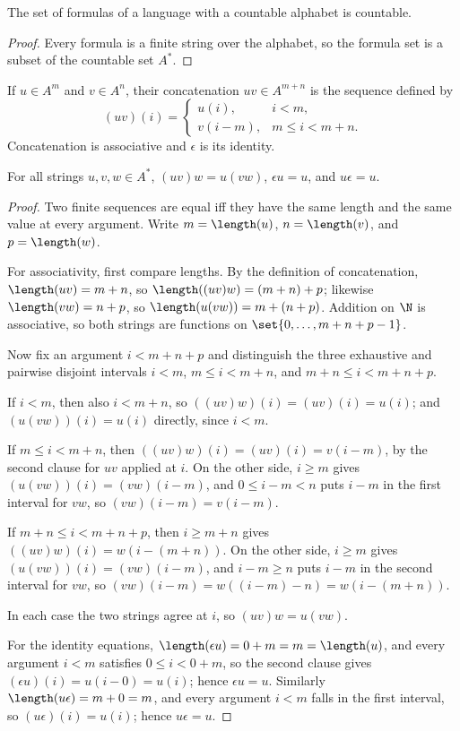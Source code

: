 \begin{corollary}
The set of formulas of a language with a countable alphabet is countable.
\end{corollary}
\begin{proof}
Every formula is a finite string over the alphabet, so the formula set is a
subset of the countable set \(A^*\).
\end{proof}

If \(u\in A^m\) and \(v\in A^n\), their concatenation \(uv\in A^{m+n}\) is
the sequence defined by
\[
  (uv)(i)=
  \begin{cases}
    u(i),&i<m,\\
    v(i-m),&m\leq i<m+n.
  \end{cases}
\]
Concatenation is associative and \(\epsilon\) is its identity.

\begin{lemma}
For all strings \(u,v,w\in A^*\),
\((uv)w=u(vw)\), \(\epsilon u=u\), and \(u\epsilon=u\).
\end{lemma}
\begin{proof}
Two finite sequences are equal iff they have the same length and the same
value at every argument.  Write \(m=\length(u)\), \(n=\length(v)\), and
\(p=\length(w)\).

For associativity, first compare lengths.  By the definition of
concatenation, \(\length(uv)=m+n\), so \(\length((uv)w)=(m+n)+p\); likewise
\(\length(vw)=n+p\), so \(\length(u(vw))=m+(n+p)\).  Addition on \(\N\) is
associative, so both strings are functions on \(\set{0,\ldots,m+n+p-1}\).

Now fix an argument \(i<m+n+p\) and distinguish the three exhaustive and
pairwise disjoint intervals \(i<m\), \(m\leq i<m+n\), and
\(m+n\leq i<m+n+p\).

If \(i<m\), then also \(i<m+n\), so
\(((uv)w)(i)=(uv)(i)=u(i)\); and \((u(vw))(i)=u(i)\) directly, since
\(i<m\).

If \(m\leq i<m+n\), then \(((uv)w)(i)=(uv)(i)=v(i-m)\), by the second
clause for \(uv\) applied at \(i\).  On the other side, \(i\geq m\) gives
\((u(vw))(i)=(vw)(i-m)\), and \(0\leq i-m<n\) puts \(i-m\) in the first
interval for \(vw\), so \((vw)(i-m)=v(i-m)\).

If \(m+n\leq i<m+n+p\), then \(i\geq m+n\) gives
\(((uv)w)(i)=w(i-(m+n))\).  On the other side, \(i\geq m\) gives
\((u(vw))(i)=(vw)(i-m)\), and \(i-m\geq n\) puts \(i-m\) in the second
interval for \(vw\), so \((vw)(i-m)=w((i-m)-n)=w(i-(m+n))\).

In each case the two strings agree at \(i\), so \((uv)w=u(vw)\).

For the identity equations, \(\length(\epsilon u)=0+m=m=\length(u)\), and
every argument \(i<m\) satisfies \(0\leq i<0+m\), so the second clause gives
\((\epsilon u)(i)=u(i-0)=u(i)\); hence \(\epsilon u=u\).  Similarly
\(\length(u\epsilon)=m+0=m\), and every argument \(i<m\) falls in the first
interval, so \((u\epsilon)(i)=u(i)\); hence \(u\epsilon=u\).
\end{proof}

